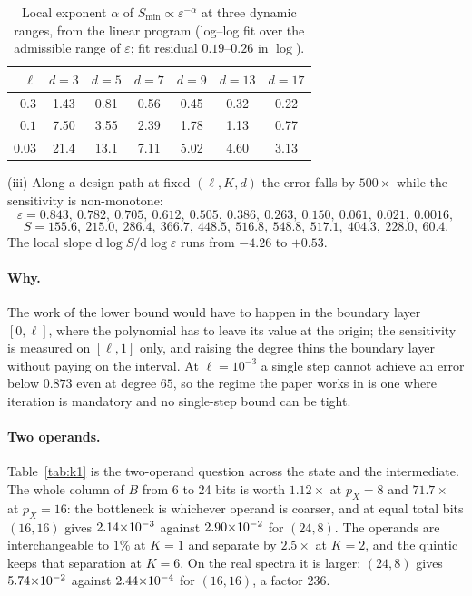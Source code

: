 \begin{table}[h]
\centering
\caption{Local exponent $\alpha$ of $S_{\min}\propto\varepsilon^{-\alpha}$ at three
dynamic ranges, from the linear program (log--log fit over the admissible range of
$\varepsilon$; fit residual $0.19$--$0.26$ in $\log$).}
\label{tab:alpha}
\begin{tabular}{rcccccc}
\toprule
$\ell$ & $d=3$ & $d=5$ & $d=7$ & $d=9$ & $d=13$ & $d=17$ \\
\midrule
$0.3$   & 1.43 & 0.81 & 0.56 & 0.45 & 0.32 & 0.22 \\
$0.1$   & 7.50 & 3.55 & 2.39 & 1.78 & 1.13 & 0.77 \\
$0.03$  & 21.4 & 13.1 & 7.11 & 5.02 & 4.60 & 3.13 \\
\bottomrule
\end{tabular}
\end{table}

(iii) Along a design path at fixed $(\ell,K,d)$ the error falls by $500\times$ while
the sensitivity is non-monotone:
\[ \varepsilon = 0.843,\ 0.782,\ 0.705,\ 0.612,\ 0.505,\ 0.386,\ 0.263,\ 0.150,\ 0.061,\ 0.021,\ 0.0016, \]
\[ S = 155.6,\ 215.0,\ 286.4,\ 366.7,\ 448.5,\ 516.8,\ 548.8,\ 517.1,\ 404.3,\ 228.0,\ 60.4. \]
The local slope
$\mathrm{d}\log S/\mathrm{d}\log\varepsilon$ runs from $-4.26$ to $+0.53$.

\paragraph{Why.}
The work of the lower bound would have to happen in the boundary layer
$[0,\ell]$, where the polynomial has to leave its value at the origin; the
sensitivity is measured on $[\ell,1]$ only, and raising the degree thins the
boundary layer without paying on the interval.  At $\ell=10^{-3}$ a single step
cannot achieve an error below $0.873$ even at degree $65$, so the regime the paper
works in is one where iteration is mandatory and no single-step bound can be tight.

\paragraph{Two operands.}
Table~\ref{tab:k1} is the two-operand question across the state and the intermediate.
The whole column of $B$ from 6 to 24 bits is worth $1.12\times$ at $p_X=8$ and
$71.7\times$ at $p_X=16$: the bottleneck is whichever operand is coarser, and at equal
total bits $(16,16)$ gives $2.14{\times}10^{-3}$ against $2.90{\times}10^{-2}$ for $(24,8)$.  The
operands are interchangeable to $1\%$ at $K=1$ and separate by $2.5\times$ at $K=2$, and
the quintic keeps that separation at $K=6$.  On the real spectra it is larger: $(24,8)$
gives $5.74{\times}10^{-2}$ against $2.44{\times}10^{-4}$ for $(16,16)$, a factor $236$.


